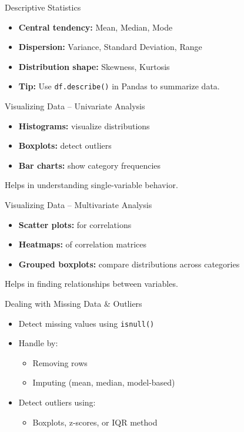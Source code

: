 \documentclass[aspectratio=169]{beamer}
\begin{document}
\begin{frame}{Descriptive Statistics}
  \begin{itemize}
    \item \textbf{Central tendency:} Mean, Median, Mode
    \item \textbf{Dispersion:} Variance, Standard Deviation, Range
    \item \textbf{Distribution shape:} Skewness, Kurtosis
    \item \textbf{Tip:} Use \texttt{df.describe()} in Pandas to summarize data.
  \end{itemize}
\end{frame}

\begin{frame}{Visualizing Data – Univariate Analysis}
  \begin{itemize}
    \item \textbf{Histograms:} visualize distributions
    \item \textbf{Boxplots:} detect outliers
    \item \textbf{Bar charts:} show category frequencies
  \end{itemize}
  \vspace{0.3cm}
  Helps in understanding single-variable behavior.
\end{frame}

\begin{frame}{Visualizing Data – Multivariate Analysis}
  \begin{itemize}
    \item \textbf{Scatter plots:} for correlations
    \item \textbf{Heatmaps:} of correlation matrices
    \item \textbf{Grouped boxplots:} compare distributions across categories
  \end{itemize}
  \vspace{0.3cm}
  Helps in finding relationships between variables.
\end{frame}

\begin{frame}{Dealing with Missing Data \& Outliers}
  \begin{itemize}
    \item Detect missing values using \texttt{isnull()}
    \item Handle by:
    \begin{itemize}
      \item Removing rows
      \item Imputing (mean, median, model-based)
    \end{itemize}
    \item Detect outliers using:
    \begin{itemize}
      \item Boxplots, z-scores, or IQR method
    \end{itemize}
  \end{itemize}
\end{frame}
\end{document}
